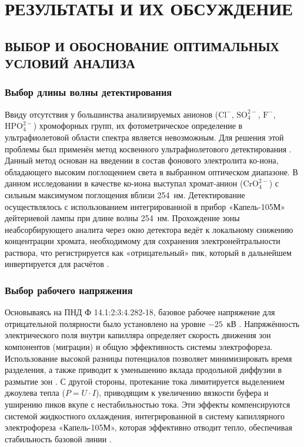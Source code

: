 \chapter{РЕЗУЛЬТАТЫ И ИХ ОБСУЖДЕНИЕ}

\section{ВЫБОР И ОБОСНОВАНИЕ ОПТИМАЛЬНЫХ УСЛОВИЙ АНАЛИЗА}

\subsection{Выбор длины волны детектирования}

Ввиду отсутствия у большинства анализируемых анионов ($\text{Cl}^-$, $\text{SO}_4^{2-}$, $\text{F}^-$, $\text{HPO}_4^{2-}$) хромофорных групп, их фотометрическое определение в ультрафиолетовой области спектра является невозможным. Для решения этой проблемы был применён метод косвенного ультрафиолетового детектирования \cite{chenUltravioletSpectroscopicDetection2021, pobozyApplicationCapillaryElectrophoresis2021b}. Данный метод основан на введении в состав фонового электролита ко-иона, обладающего высоким поглощением света в выбранном оптическом диапазоне. В данном исследовании в качестве ко-иона выступал хромат-анион ($\text{CrO}_4^{2-}$) с сильным максимумом поглощения вблизи 254~нм. Детектирование осуществлялось с использованием интегрированной в прибор «Капель-105М» дейтериевой лампы при длине волны 254~нм. Прохождение зоны неабсорбирующего аналита через окно детектора ведёт к локальному снижению концентрации хромата, необходимому для сохранения электронейтральности раствора, что регистрируется как «отрицательный» пик, который в дальнейшем инвертируется для расчётов \cite{komarova2006prakticheskoe, shelekhovaOpredelenieAnionovNeorganicheskikh2023}.

\subsection{Выбор рабочего напряжения}

Основываясь на ПНД Ф 14.1:2:3:4.282-18, базовое рабочее напряжение для отрицательной полярности было установлено на уровне $-25$~кВ \cite{pndf14123428218}. Напряжённость электрического поля внутри капилляра определяет скорость движения зон компонентов (миграции) и общую эффективность системы электрофореза. Использование высокой разницы потенциалов позволяет минимизировать время разделения, а также приводит к уменьшению вклада продольной диффузии в размытие зон \cite{komarova2006prakticheskoe, pobozyApplicationCapillaryElectrophoresis2021b}. С другой стороны, протекание тока лимитируется выделением джоулева тепла ($P = U \cdot I$), приводящим к увеличению вязкости буфера и уширению пиков вкупе с нестабильностью тока. Эти эффекты компенсируются системой жидкостного охлаждения, интегрированной в систему капиллярного электрофореза «Капель-105М», которая эффективно отводит тепло, обеспечивая стабильность базовой линии \cite{komarova2006prakticheskoe, pndf14123428218}.

